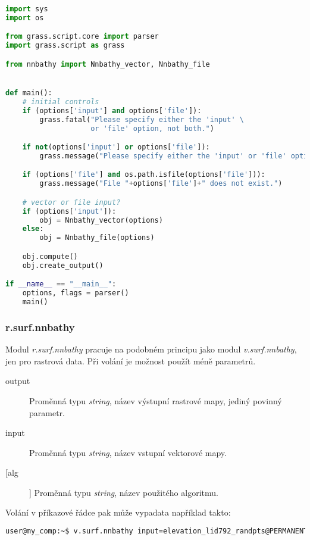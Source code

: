 \documentclass[12pt,a4paper]{article}
\begin{document}
\begin{lstlisting}[language=python, caption={python version}]
import sys
import os

from grass.script.core import parser
import grass.script as grass

from nnbathy import Nnbathy_vector, Nnbathy_file


def main():
    # initial controls
    if (options['input'] and options['file']):
        grass.fatal("Please specify either the 'input' \
                    or 'file' option, not both.")

    if not(options['input'] or options['file']):
        grass.message("Please specify either the 'input' or 'file' option.")

    if (options['file'] and os.path.isfile(options['file'])):
        grass.message("File "+options['file']+" does not exist.")

    # vector or file input?
    if (options['input']):
        obj = Nnbathy_vector(options)
    else:
        obj = Nnbathy_file(options)

    obj.compute()
    obj.create_output()

if __name__ == "__main__":
    options, flags = parser()
    main()

\end{lstlisting}

\subsubsection{r.surf.nnbathy}
Modul \textit{r.surf.nnbathy} pracuje na podobném principu jako modul \textit{v.surf.nnbathy}, jen pro rastrová data. Při volání je možnost použít méně parametrů.
\begin{description}
\item[output] Proměnná typu \textit{string}, název výstupní rastrové mapy, jediný povinný parametr.
\item[input] Proměnná typu \textit{string}, název vstupní vektorové mapy.
\item[[alg]] Proměnná typu \textit{string}, název použitého algoritmu.
\end{description}

Volání v příkazové řádce pak může vypadata například takto:
\begin{lstlisting}[language=bash,caption={bash version}]
user@my_comp:~$ v.surf.nnbathy input=elevation_lid792_randpts@PERMANENT output=raster_map zcolumn=value alg=nn
\end{lstlisting}
\end{document}

